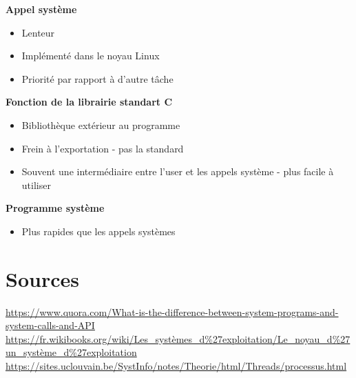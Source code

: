 \documentclass[10pt,a4paper]{article}
\begin{document}
\textbf{Appel système\\}
\begin{itemize}
\item Lenteur 
\item Implémenté dans le noyau Linux 
\item Priorité par rapport à d'autre tâche 
\end{itemize}

\textbf{Fonction de la librairie standart C\\}
\begin{itemize}
\item Bibliothèque extérieur au programme
\item Frein à l'exportation - pas la standard 
\item Souvent une intermédiaire entre l'user et les appels système - plus facile à utiliser 
\end{itemize}

\textbf{Programme système\\}
\begin{itemize}
\item Plus rapides que les appels systèmes 
\end{itemize}

\section{Sources}
\url{https://www.quora.com/What-is-the-difference-between-system-programs-and-system-calls-and-API}
\url{https://fr.wikibooks.org/wiki/Les_systèmes_d\%27exploitation/Le_noyau_d\%27un_système_d\%27exploitation}
\url{https://sites.uclouvain.be/SystInfo/notes/Theorie/html/Threads/processus.html}
\end{document}

